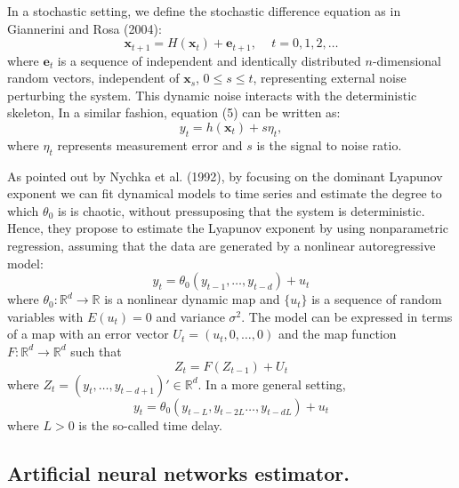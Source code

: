\documentclass[12pt]{article}
\begin{document}
In a stochastic setting, we define the stochastic difference equation as in Giannerini and Rosa (2004):
\begin{equation}
\mathbf{x}_{t+1}=H(\mathbf{x}_t)+\mathbf{e}_{t+1},\,\,\,\,\,\,\, t=0,1,2,\ldots
\end{equation}
where $\mathbf{e}_t$ is a sequence of independent and identically distributed $n$-dimensional random vectors, independent of $\mathbf{x}_s$, $0\leq s \leq t$, representing external noise perturbing the system. This dynamic noise interacts with the deterministic skeleton, In a similar fashion, equation (5) can be written as:
\begin{equation}
y_{t}=h(\mathbf{x}_t)+ s\eta_t,
\end{equation}
where $\eta_t$ represents measurement error and $s$ is the signal to noise ratio.



As pointed out by Nychka et al. (1992), by focusing on the dominant Lyapunov exponent we can fit dynamical models to time series and estimate the degree to which $\theta_{0}$ is is chaotic, without pressuposing that the system is deterministic. Hence, they propose to estimate the Lyapunov exponent by using nonparametric regression, assuming that the data are generated by a nonlinear autoregressive model:
\begin{equation}
y_{t}=\theta_{0}(y_{t-1},\ldots,y_{t-d})+u_{t}
\end{equation}
where $\theta_{0}:\mathbb{R}^{d}\rightarrow\mathbb{R}$ is a nonlinear dynamic
map and $\{u_{t}\}$ is a sequence of random variables with $E(u_t)=0$ and variance $\sigma^2$. The model can be expressed
in terms of a map with an error vector $U_{t}=(u_{t},0,\ldots,0)$ and the map
function $F:\mathbb{R}^{d}\rightarrow\mathbb{R}^{d}$ such that
\begin{equation}
Z_{t}=F(Z_{t-1})+U_{t}
\end{equation}
where $Z_{t}=(y_{t},\ldots,y_{t-d+1})'\in\mathbb{R}^{d}$. In a more general setting,
\begin{equation}
y_{t}=\theta_{0}(y_{t-L},y_{t-2L}\ldots,y_{t-dL})+u_{t}
\end{equation}
where $L>0$ is the so-called time delay.  




\subsection{Artificial neural networks estimator.}
\end{document}
